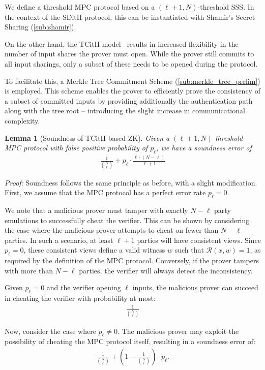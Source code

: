 \documentclass[11pt]{report}
\theoremstyle{definition}
\theoremstyle{plain}
\newtheorem{lemma}{Lemma}[section]
\begin{document}
We define a threshold MPC protocol based on a $(\ell + 1, N)$-threshold SSS. In the context of the SDitH protocol, this can be instantiated with Shamir's Secret Sharing (\autoref{sub:shamir}).

On the other hand, the TCitH model~\cite{feneuil2023threshold} results in increased flexibility in the number of input shares the prover must open. While the prover still commits to all input sharings, only a subset of these needs to be opened during the protocol.

To facilitate this, a Merkle Tree Commitment Scheme (\autoref{sub:merkle_tree_prelim}) is employed. This scheme enables the prover to efficiently prove the consistency of a subset of committed inputs by providing additionally the authentication path along with the tree root -- introducing the slight increase in communicational complexity.

\begin{lemma}[Soundness of TCitH based ZK]
  Given a $(\ell +1,N)$-threshold MPC protocol with false positive probability of $p_{\ell}$, we have a soundness error of
  \begin{align*}
    \frac{1}{\binom{N}{\ell}} + p_{\ell} \cdot \frac{\ell \cdot (N - \ell)}{\ell + 1}
  \end{align*}
\end{lemma}

\textit{Proof:} Soundness follows the same principle as before, with a slight modification. First, we assume that the MPC protocol has a perfect error rate $p_{\ell} = 0$. 

We note that a malicious prover must tamper with exactly $N - \ell$ party emulations to successfully cheat the verifier. This can be shown by considering the case where the malicious prover attempts to cheat on fewer than $N - \ell$ parties. In such a scenario, at least $\ell + 1$ parties will have consistent views. Since $p_{\ell} = 0$, these consistent views define a valid witness $w$ such that $\mathcal{R}(x, w) = 1$, as required by the definition of the MPC protocol. Conversely, if the prover tampers with more than $N - \ell$ parties, the verifier will always detect the inconsistency.


Given $p_{\ell} = 0$ and the verifier opening $\ell$ inputs, the malicious prover can succeed in cheating the verifier with probability at most:
\begin{align*}
  \frac{1}{\binom{N}{\ell}}
\end{align*}

Now, consider the case where $p_{\ell} \neq 0$. The malicious prover may exploit the possibility of cheating the MPC protocol itself, resulting in a soundness error of:
\begin{align*}
  \frac{1}{\binom{N}{\ell}} + \left(1 - \frac{1}{\binom{N}{\ell}}\right) \cdot p_{\ell}.
\end{align*}
\end{document}
